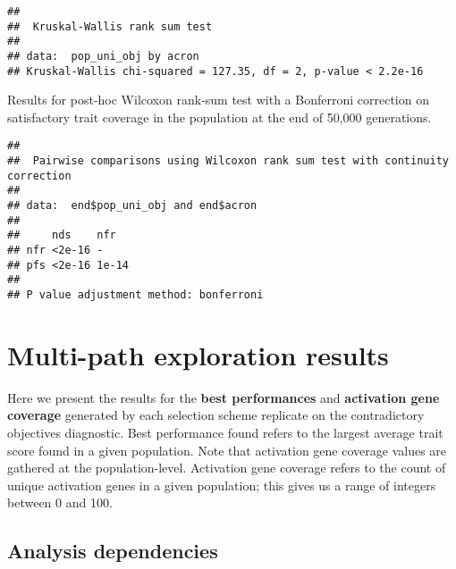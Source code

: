 \documentclass[]{book}
\newenvironment{Shaded}{\begin{snugshade}}{\end{snugshade}}
\newcommand{\DataTypeTok}[1]{\textcolor[rgb]{0.13,0.29,0.53}{#1}}
\newcommand{\KeywordTok}[1]{\textcolor[rgb]{0.13,0.29,0.53}{\textbf{#1}}}
\newcommand{\NormalTok}[1]{#1}
\newcommand{\OperatorTok}[1]{\textcolor[rgb]{0.81,0.36,0.00}{\textbf{#1}}}
\newcommand{\OtherTok}[1]{\textcolor[rgb]{0.56,0.35,0.01}{#1}}
\newcommand{\StringTok}[1]{\textcolor[rgb]{0.31,0.60,0.02}{#1}}
\begin{document}
\begin{verbatim}
## 
##  Kruskal-Wallis rank sum test
## 
## data:  pop_uni_obj by acron
## Kruskal-Wallis chi-squared = 127.35, df = 2, p-value < 2.2e-16
\end{verbatim}

Results for post-hoc Wilcoxon rank-sum test with a Bonferroni correction on satisfactory trait coverage in the population at the end of 50,000 generations.

\begin{Shaded}
\end{Shaded}

\begin{verbatim}
## 
##  Pairwise comparisons using Wilcoxon rank sum test with continuity correction 
## 
## data:  end$pop_uni_obj and end$acron 
## 
##     nds    nfr  
## nfr <2e-16 -    
## pfs <2e-16 1e-14
## 
## P value adjustment method: bonferroni
\end{verbatim}

\hypertarget{multi-path-exploration-results}{%
\chapter{Multi-path exploration results}\label{multi-path-exploration-results}}

Here we present the results for the \textbf{best performances} and \textbf{activation gene coverage} generated by each selection scheme replicate on the contradictory objectives diagnostic.
Best performance found refers to the largest average trait score found in a given population.
Note that activation gene coverage values are gathered at the population-level.
Activation gene coverage refers to the count of unique activation genes in a given population; this gives us a range of integers between 0 and 100.

\hypertarget{analysis-dependencies-3}{%
\section{Analysis dependencies}\label{analysis-dependencies-3}}
\end{document}
